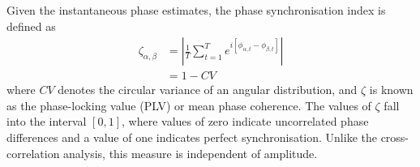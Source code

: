 \documentclass[]{article}
\begin{document}
Given the instantaneous phase estimates, the phase synchronisation index is defined as
\begin{align}
\zeta_{\alpha,\beta} &= \left|\frac{1}{T}\sum_{t=1}^T e^{i[\phi_{\alpha,t}-\phi_{\beta,t}]}\right| \\
 &=1-CV
\end{align}
where $CV$ denotes the circular variance of an angular distribution,
and $\zeta$ is known as the phase-locking value (PLV) or
mean phase coherence. The values of $\zeta$ fall into the
interval $[0,1]$, where values of zero indicate uncorrelated phase
differences and a value of one indicates perfect
synchronisation. Unlike the cross-correlation analysis, this measure is independent of amplitude.\\

%
%








\end{document}
